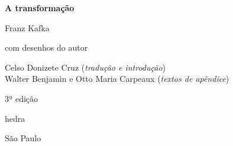 




\begingroup\thispagestyle{empty}\vspace*{.05\textheight} 

              \formular
              \Huge
              \noindent
              \textbf{A transformação}
              
              {\brabo\LARGE
              \noindent Franz Kafka}

              {\braboitalic\Large
              \noindent{}com desenhos do autor}
              
              \vfill
              
              \newfontfamily{}
              {\fontsize{30}{40}\selectfont\minion\small
              \noindent{}Celso Donizete Cruz (\textit{tradução e introdução})\\
              
              \vspace{-2.5em}
              \noindent{}Walter Benjamin e Otto Maria Carpeaux (\textit{textos de apêndice})
              }

              \noindent
              {\fontsize{30}{40}\selectfont\minion\small\noindent 3ª edição}

              \vfill

              \newfontfamily{}
              {\noindent\fontsize{30}{40}\selectfont \timesnewroman hedra}

              \vspace{-0.5cm}
              {\selectfont\minion\small\noindent São Paulo \quad\the\year}

\endgroup
\pagebreak

